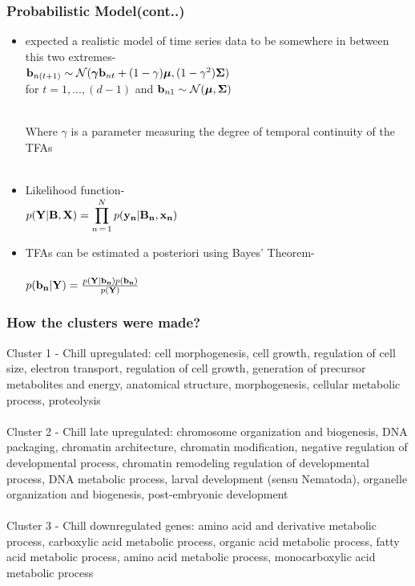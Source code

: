 \documentclass{beamer}
\begin{document}
\begin{frame}
\frametitle{Probabilistic Model(cont..)}

\begin{itemize}
\item  \cite{p2}  expected a realistic model of time series data to be somewhere in between this two extremes- \\
\centering $ \bold{b}_{n(t+1)} \sim \mathcal{N} (\boldsymbol{\gamma}\bold{b}_{nt} + (1-\gamma)\boldsymbol{\mu},(1-\gamma^2)\boldsymbol{\Sigma})$ \\
for $ t= 1, ... , (d-1)$ and $ \bold{b}_{n1} \sim \mathcal{N} ( \boldsymbol{\mu},\boldsymbol{\Sigma})$
\raggedright
\\ Where $ \gamma $ is a parameter measuring the degree of temporal continuity of the TFAs \\~\\

\item Likelihood function-\\
\centering 
$p(\bold{Y|B,X})= \displaystyle \prod_{n \mathop = 1}^{N} p(\bold{y_n|B_n,x_n})$

\raggedright
\item TFAs can be estimated a posteriori using Bayes' Theorem- \\~\\
\centering 
$ p(\bold{b_n|Y})= \frac {p(\bold{Y|b_n})p(\bold{b_n})}{p(\bold{Y})} $

\end {itemize}
\end{frame}


\begin{frame}

\frametitle{How the clusters were made?}

{\color{red} Cluster 1} - {\color{blue} Chill upregulated:}  
cell morphogenesis, cell growth, regulation of cell size, electron transport, regulation of cell growth, generation of precursor metabolites and energy, anatomical structure,  morphogenesis, cellular metabolic process, proteolysis\\~\\

{\color{red}Cluster 2} - {\color{blue} Chill late upregulated:}
chromosome organization and biogenesis, DNA packaging, chromatin architecture, chromatin modification, negative regulation of developmental process, chromatin remodeling regulation of developmental process, DNA metabolic process, larval development (sensu Nematoda), organelle organization and biogenesis, post-embryonic development\\~\\

{\color{red} Cluster 3} - {\color{blue} Chill downregulated genes:} 
amino acid and derivative metabolic process, carboxylic acid metabolic process, organic acid metabolic process, fatty acid metabolic process, amino acid metabolic process, monocarboxylic acid metabolic process

\end{frame}
\end{document}
